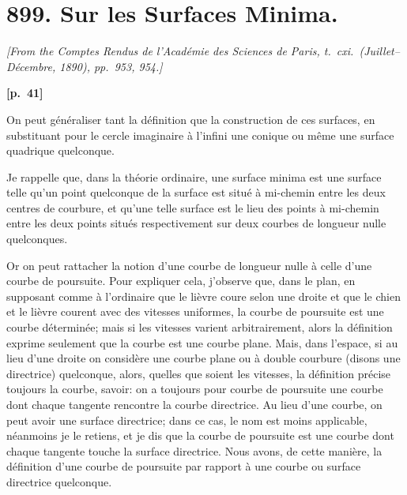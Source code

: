 \documentclass[11pt,a4paper]{book}
\begin{document}
\newpage

\section*{899. Sur les Surfaces Minima.}

\noindent\textit{[From the Comptes Rendus de l'Acad\'emie des Sciences de Paris, t.\ cxi.\ (Juillet--D\'ecembre, 1890), pp.\ 953, 954.]}

\vspace{0.5em}
\noindent\textbf{[p.\ 41]}

On peut g\'en\'eraliser tant la d\'efinition que la construction de ces surfaces, en substituant pour le cercle imaginaire \`a l'infini une conique ou m\^eme une surface quadrique quelconque.

Je rappelle que, dans la th\'eorie ordinaire, une surface minima est une surface telle qu'un point quelconque de la surface est situ\'e \`a mi-chemin entre les deux centres de courbure, et qu'une telle surface est le lieu des points \`a mi-chemin entre les deux points situ\'es respectivement sur deux courbes de longueur nulle quelconques.

Or on peut rattacher la notion d'une courbe de longueur nulle \`a celle d'une courbe de poursuite. Pour expliquer cela, j'observe que, dans le plan, en supposant comme \`a l'ordinaire que le li\`evre coure selon une droite et que le chien et le li\`evre courent avec des vitesses uniformes, la courbe de poursuite est une courbe d\'etermin\'ee; mais si les vitesses varient arbitrairement, alors la d\'efinition exprime seulement que la courbe est une courbe plane. Mais, dans l'espace, si au lieu d'une droite on consid\`ere une courbe plane ou \`a double courbure (disons une directrice) quelconque, alors, quelles que soient les vitesses, la d\'efinition pr\'ecise toujours la courbe, savoir: on a toujours pour courbe de poursuite une courbe dont chaque tangente rencontre la courbe directrice. Au lieu d'une courbe, on peut avoir une surface directrice; dans ce cas, le nom est moins applicable, n\'eanmoins je le retiens, et je dis que la courbe de poursuite est une courbe dont chaque tangente touche la surface directrice. Nous avons, de cette mani\`ere, la d\'efinition d'une courbe de poursuite par rapport \`a une courbe ou surface directrice quelconque.
\end{document}
